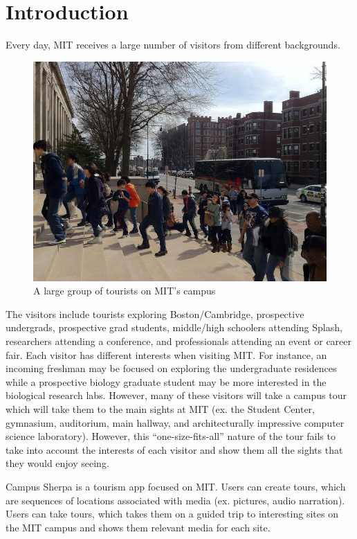 \documentclass{sigchi}
\begin{document}
\section{Introduction}

Every day, MIT receives a large number of visitors from different backgrounds. 

\begin{figure}[h]
\centering
\includegraphics[width=1.0\linewidth]{./Tourists}
\caption{A large group of tourists on MIT's campus}
\label{fig:Tourists}
\end{figure}

The visitors include tourists exploring Boston/Cambridge, prospective undergrads, prospective grad students, middle/high schoolers attending Splash, researchers attending a conference, and professionals attending an event or career fair. Each visitor has different interests when visiting MIT. For instance, an incoming freshman may be focused on exploring the undergraduate residences while a prospective biology graduate student may be more interested in the biological research labs. However, many of these visitors will take a campus tour which will take them to the main sights at MIT (ex. the Student Center, gymnasium, auditorium, main hallway, and architecturally impressive computer science laboratory).
However, this ``one-size-fits-all'' nature of the tour fails to take into account the interests of each visitor and show them all the sights that they would enjoy seeing. 

Campus Sherpa is a tourism app focused on MIT. Users can create tours, which are sequences of locations associated with media (ex. pictures, audio narration). Users can take tours, which takes them on a guided trip to interesting sites on the MIT campus and shows them relevant media for each site.
\end{document}
